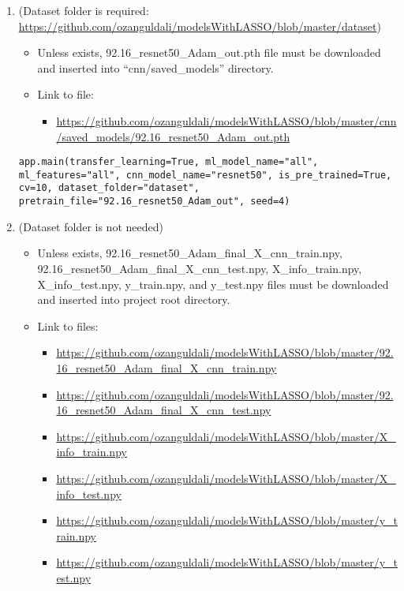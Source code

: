 \begin{enumerate}
\itemsep1pt\parskip0pt
\item
  (Dataset folder is required:
  \url{https://github.com/ozanguldali/modelsWithLASSO/blob/master/dataset})\\

\begin{itemize}
\itemsep1pt\parskip0pt
\item
  Unless exists, 92.16\_resnet50\_Adam\_out.pth file must be downloaded
  and inserted into ``cnn/saved\_models'' directory.\\
\item
  Link to file:\\
    \begin{itemize}
      \item 
  \url{https://github.com/ozanguldali/modelsWithLASSO/blob/master/cnn/saved_models/92.16_resnet50_Adam_out.pth}
    \end{itemize}

\end{itemize}

\texttt{app.main(transfer\_learning=True, ml\_model\_name="all", ml\_features="all", cnn\_model\_name="resnet50", is\_pre\_trained=True,          cv=10, dataset\_folder="dataset", pretrain\_file="92.16\_resnet50\_Adam\_out", seed=4)}

\itemsep1pt\parskip0pt
\item (Dataset folder is not needed)

\begin{itemize}
\itemsep1pt\parskip0pt
\item
  Unless exists, 92.16\_resnet50\_Adam\_final\_X\_cnn\_train.npy,
  92.16\_resnet50\_Adam\_final\_X\_cnn\_test.npy, X\_info\_train.npy,
  X\_info\_test.npy, y\_train.npy, and y\_test.npy files must be
  downloaded and inserted into project root directory.\\
\item
  Link to files:\\
  \begin{itemize}
\item
  \url{https://github.com/ozanguldali/modelsWithLASSO/blob/master/92.16_resnet50_Adam_final_X_cnn_train.npy}\\
\item
  \url{https://github.com/ozanguldali/modelsWithLASSO/blob/master/92.16_resnet50_Adam_final_X_cnn_test.npy}\\
\item
  \url{https://github.com/ozanguldali/modelsWithLASSO/blob/master/X_info_train.npy}\\
\item
  \url{https://github.com/ozanguldali/modelsWithLASSO/blob/master/X_info_test.npy}\\
\item
  \url{https://github.com/ozanguldali/modelsWithLASSO/blob/master/y_train.npy}\\
\item
  \url{https://github.com/ozanguldali/modelsWithLASSO/blob/master/y_test.npy}
\end{itemize}
\end{itemize}


\end{enumerate}
